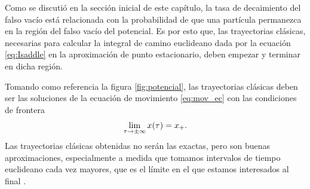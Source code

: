  

Como se discutió en la sección inicial de este capítulo, la tasa de decaimiento del falso vacío está relacionada con la probabilidad de que una partícula permanezca en la región del falso vacío del potencial. %
Es por esto que, las trayectorias clásicas, necesarias para calcular la integral de camino euclideano dada por la ecuación \eqref{eq:Isaddle} en la aproximación de punto estacionario, deben empezar y terminar en dicha región. 

%
Tomando como referencia la figura \ref{fig:potencial}, las trayectorias clásicas deben ser las soluciones de la ecuación de movimiento \eqref{eq:mov_ec} con las condiciones de frontera \cite{coleman1977fate}
\begin{equation} \label{eq:cond_frontera}
	\lim_{\tau \rightarrow \pm\infty} x\qty(\tau) = x_+.
\end{equation} 
Las trayectorias clásicas obtenidas no serán las exactas, pero son buenas aproximaciones, especialmente a medida que tomamos intervalos de tiempo euclideano cada vez mayores, que es el límite en el que estamos interesados al final \cite{paranjape2017theory, callan1977fate}. 

